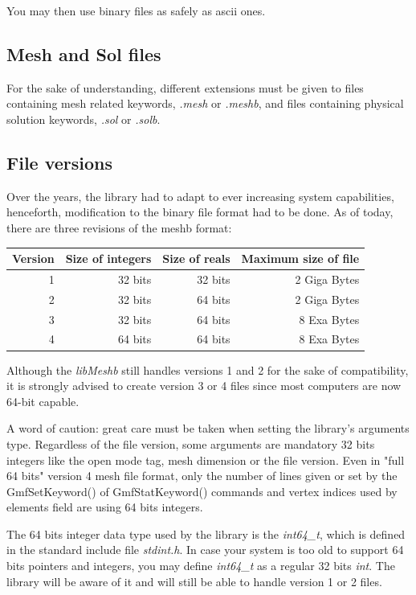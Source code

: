 \documentclass[a4paper,12pt]{article}
\begin{document}
You may then use binary files as safely as ascii ones.

\subsection{Mesh and Sol files}
For the sake of understanding, different extensions must be given to files containing mesh related keywords, \emph{.mesh} or \emph{.meshb}, and files containing physical solution keywords, \emph{.sol} or \emph{.solb}.

\subsection{File versions}
Over the years, the library had to adapt to ever increasing system capabilities, henceforth, modification to the binary file format had to be done. As of today, there are three revisions of the meshb format:
\medskip

\begin{tabular}{|r|r|r|r|}
\hline
Version & Size of integers & Size of reals & Maximum size of file \\
\hline
1 & 32 bits & 32 bits & 2 Giga Bytes \\
\hline
2 & 32 bits & 64 bits & 2 Giga Bytes \\
\hline
3 & 32 bits & 64 bits & 8 Exa Bytes \\
\hline
4 & 64 bits & 64 bits & 8 Exa Bytes \\
\hline
\end{tabular}
\medskip

Although the \emph{libMeshb} still handles versions 1 and 2 for the sake of compatibility, it is strongly advised to create version 3 or 4 files since most computers are now 64-bit capable.

A word of caution: great care must be taken when setting the library's arguments type. Regardless of the file version, some arguments are mandatory 32 bits integers like the open mode tag, mesh dimension or the file version. Even in "full 64 bits" version 4 mesh file format, only the number of lines given or set by the GmfSetKeyword() of GmfStatKeyword() commands and vertex indices used by elements field are using 64 bits integers.

The 64 bits integer data type used by the library is the \emph{int64\_t}, which is defined in the standard include file \emph{stdint.h}. In case your system is too old to support 64 bits pointers and integers, you may define \emph{int64\_t} as a regular 32 bits \emph{int}. The library will be aware of it and will still be able to handle version 1 or 2 files.
\end{document}
